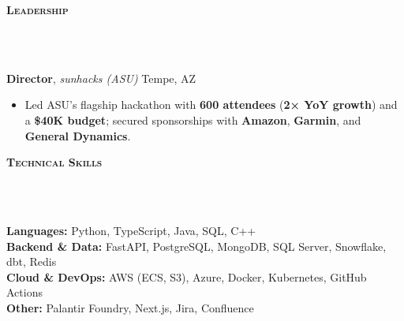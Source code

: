 \documentclass[10pt]{article}
\newcommand{\lineunder} {
    \vspace*{-10pt} \\
    \hspace*{-18pt} \hrulefill \\
    \vspace*{2pt}
}
\newcommand{\header} [1] {
  \vspace*{2pt}
    {\hspace*{-15pt}\textsc{#1}}
    \lineunder
}
\begin{document}
\header{\textbf{Leadership}}

\textbf{Director}, \textit{sunhacks (ASU)} \hfill Tempe, AZ\\
\begin{itemize}[leftmargin=5mm, itemsep=0mm]
  \item Led ASU's flagship hackathon with \textbf{600 attendees} (\textbf{2× YoY growth}) and a \textbf{\$40K budget}; secured sponsorships with \textbf{Amazon}, \textbf{Garmin}, and \textbf{General Dynamics}.
\end{itemize}

\header{\textbf{Technical Skills}}
\textbf{Languages:} Python, TypeScript, Java, SQL, C++\\
\textbf{Backend \& Data:} FastAPI, PostgreSQL, MongoDB, SQL Server, Snowflake, dbt, Redis\\
\textbf{Cloud \& DevOps:} AWS (ECS, S3), Azure, Docker, Kubernetes, GitHub Actions\\
\textbf{Other:} Palantir Foundry, Next.js, Jira, Confluence
\end{document}
